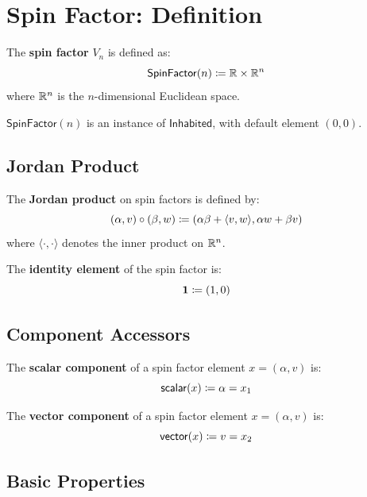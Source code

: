 \section{Spin Factor: Definition}

\begin{definition}[SpinFactor]
The \textbf{spin factor} $V_n$ is defined as:
\[ \mathsf{SpinFactor}(n) \coloneqq \mathbb{R} \times \mathbb{R}^n \]
where $\mathbb{R}^n$ is the $n$-dimensional Euclidean space.
\end{definition}

\begin{proposition}
$\mathsf{SpinFactor}(n)$ is an instance of $\mathsf{Inhabited}$, with default element $(0, 0)$.
\end{proposition}

\subsection{Jordan Product}

\begin{definition}[jordanMul]
The \textbf{Jordan product} on spin factors is defined by:
\[ (\alpha, v) \circ (\beta, w) \coloneqq (\alpha\beta + \langle v, w \rangle, \alpha w + \beta v) \]
where $\langle \cdot, \cdot \rangle$ denotes the inner product on $\mathbb{R}^n$.
\end{definition}

\begin{definition}[one]
The \textbf{identity element} of the spin factor is:
\[ \mathbf{1} \coloneqq (1, 0) \]
\end{definition}

\subsection{Component Accessors}

\begin{definition}[scalar]
The \textbf{scalar component} of a spin factor element $x = (\alpha, v)$ is:
\[ \mathsf{scalar}(x) \coloneqq \alpha = x_1 \]
\end{definition}

\begin{definition}[vector]
The \textbf{vector component} of a spin factor element $x = (\alpha, v)$ is:
\[ \mathsf{vector}(x) \coloneqq v = x_2 \]
\end{definition}

\subsection{Basic Properties}

